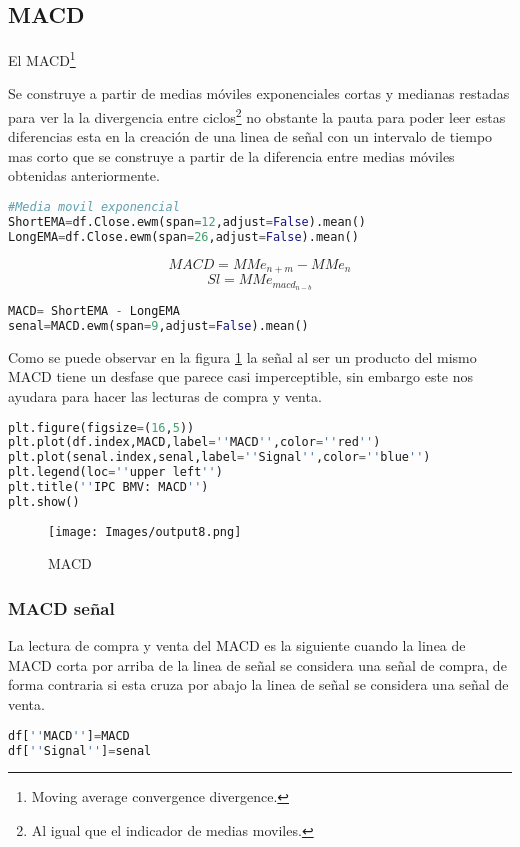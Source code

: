 \documentclass[letterpaper,12pt,oneside]{book}
\begin{document}
\subsection{MACD}

El MACD\footnote{Moving average convergence divergence.}

Se construye a partir de medias móviles exponenciales cortas y medianas restadas para ver la la divergencia entre ciclos\footnote{Al igual que el indicador de medias moviles.} no obstante la pauta para poder leer estas diferencias esta en la creación de una linea de señal con un intervalo de tiempo mas corto que se construye a partir de la diferencia entre medias móviles obtenidas anteriormente.




\begin{lstlisting}[language=Python]
#Media movil exponencial
ShortEMA=df.Close.ewm(span=12,adjust=False).mean()
LongEMA=df.Close.ewm(span=26,adjust=False).mean()
\end{lstlisting}


\[MACD= MMe_{n+m} - MMe_n \]
\[Sl= MMe_{macd_{n - b}} \]

\begin{lstlisting}[language=Python]
MACD= ShortEMA - LongEMA
senal=MACD.ewm(span=9,adjust=False).mean()
\end{lstlisting}

Como se puede observar en la figura \ref{fig:m9.1} la señal al ser un producto del mismo MACD tiene un desfase que parece casi imperceptible, sin embargo este nos ayudara para hacer las lecturas de compra y venta.

\begin{lstlisting}[language=Python]
plt.figure(figsize=(16,5))
plt.plot(df.index,MACD,label=''MACD'',color=''red'')
plt.plot(senal.index,senal,label=''Signal'',color=''blue'')
plt.legend(loc=''upper left'')
plt.title(''IPC BMV: MACD'')
plt.show()
\end{lstlisting}

\begin{figure}[ht]
	\centering
	\texttt{[image: Images/output8.png]}
	\caption{MACD}
	\label{fig:m9.1}
\end{figure}


\subsubsection{MACD señal}

La lectura de compra y venta del MACD es la siguiente cuando la linea de MACD corta por arriba de la linea de señal se considera una señal de compra, de forma contraria si esta cruza por abajo la linea de señal se considera una señal de venta.
\begin{lstlisting}[language=Python]
df[''MACD'']=MACD
df[''Signal'']=senal
\end{lstlisting}
\end{document}
